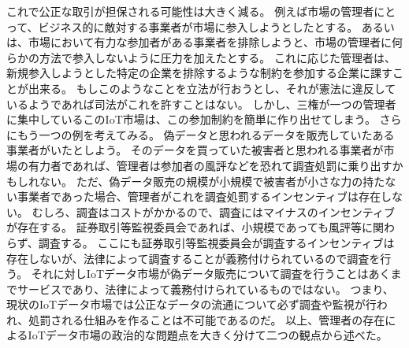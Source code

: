 これで公正な取引が担保される可能性は大きく減る。
例えば市場の管理者にとって、ビジネス的に敵対する事業者が市場に参入しようとしたとする。
あるいは、市場において有力な参加者がある事業者を排除しようと、市場の管理者に何らかの方法で参入しないように圧力を加えたとする。
これに応じた管理者は、新規参入しようとした特定の企業を排除するような制約を参加する企業に課すことが出来る。
もしこのようなことを立法が行おうとし、それが憲法に違反しているようであれば司法がこれを許すことはない。
しかし、三権が一つの管理者に集中しているこのIoT市場は、この参加制約を簡単に作り出せてしまう。
さらにもう一つの例を考えてみる。
偽データと思われるデータを販売していたある事業者がいたとしよう。
そのデータを買っていた被害者と思われる事業者が市場の有力者であれば、管理者は参加者の風評などを恐れて調査処罰に乗り出すかもしれない。
ただ、偽データ販売の規模が小規模で被害者が小さな力の持たない事業者であった場合、管理者がこれを調査処罰するインセンティブは存在しない。
むしろ、調査はコストがかかるので、調査にはマイナスのインセンティブが存在する。
証券取引等監視委員会であれば、小規模であっても風評等に関わらず、調査する。
ここにも証券取引等監視委員会が調査するインセンティブは存在しないが、法律によって調査することが義務付けられているので調査を行う。
それに対しIoTデータ市場が偽データ販売について調査を行うことはあくまでサービスであり、法律によって義務付けられているものではない。
つまり、現状のIoTデータ市場では公正なデータの流通について必ず調査や監視が行われ、処罰される仕組みを作ることは不可能であるのだ。
以上、管理者の存在によるIoTデータ市場の政治的な問題点を大きく分けて二つの観点から述べた。

